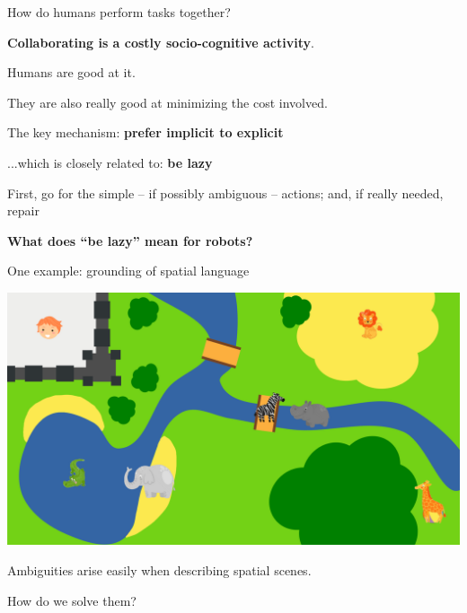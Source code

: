 \documentclass[compress]{beamer}
\begin{document}
\begin{frame}{How do humans perform tasks together?}


    \begin{center}
        {\bf Collaborating is a costly socio-cognitive activity}.

    \pause
    Humans are good at it.
        
    They are also really good at minimizing the cost
    involved.
    \pause
    
        The key mechanism: {\bf prefer implicit to explicit}

    \pause

        ...which is closely related to: {\bf be lazy}
        
        First, go for the simple -- if possibly ambiguous -- actions; and, if
        really needed, repair

    \pause
    \vspace{2cm}
    {\bf What does ``be lazy'' mean for robots?}
    \end{center}
        
\end{frame}

\begin{frame}{One example: grounding of spatial language}


    \begin{center}
        \includegraphics[width=0.9\linewidth]{ambiguous-desc/RefMap}

    Ambiguities arise easily when describing spatial scenes.

    How do we solve them?

    \end{center}

\end{frame}

\end{document}
